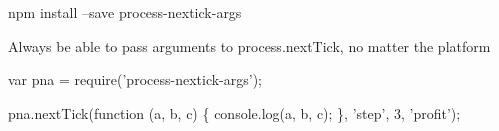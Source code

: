 \href{https://travis-ci.org/calvinmetcalf/process-nextick-args}{\tt }


\begin{DoxyCode}
npm install --save process-nextick-args
\end{DoxyCode}


Always be able to pass arguments to process.\+next\+Tick, no matter the platform


\begin{DoxyCode}
var pna = require('process-nextick-args');

pna.nextTick(function (a, b, c) \{
  console.log(a, b, c);
\}, 'step', 3,  'profit');
\end{DoxyCode}
 